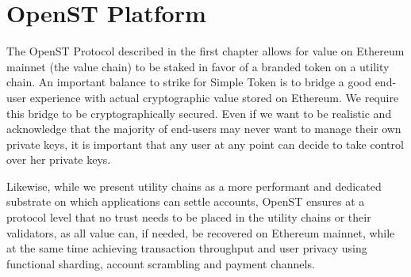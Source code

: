 \documentclass[12pt,a4paper, twocolumn]{article}
\begin{document}
\section{OpenST Platform}

The OpenST Protocol described in the first chapter allows for value on Ethereum mainnet (the value chain) to be staked in favor of a branded token on a utility chain.  An important balance to strike for Simple Token is to bridge a good end-user experience with actual cryptographic value stored on Ethereum.  We require this bridge to be cryptographically secured.  Even if we want to be realistic and acknowledge that the majority of end-users may never want to manage their own private keys, it is important that any user at any point can decide to take control over her private keys. \par
Likewise, while we present utility chains as a more performant and dedicated substrate on which applications can settle accounts, OpenST ensures at a protocol level that no trust needs to be placed in the utility chains or their validators, as all value can, if needed, be recovered on Ethereum mainnet, while at the same time achieving transaction throughput and user privacy using functional sharding, account scrambling and payment channels. \par
\end{document}
